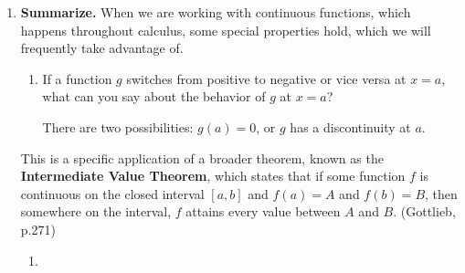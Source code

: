\documentclass[main]{subfiles}
\providecommand{\note}[1]{}
\begin{document}
\begin{enumerate}[resume]
\begin{enumerate}
    \begin{solution}
      If we get rid of the requirement that the function is continuous, then it's possible:
      \begin{center}
      \end{center}
    \end{solution}

  \end{enumerate}

\item  \textbf{Summarize.} When we are working with continuous functions, which happens throughout calculus, some special properties hold, which we will frequently take advantage of. 

  \begin{enumerate}
  \item
    \note{There are two possibilities: $g(a) = 0$ or $g$ has a discontinuity at $a$.}

    \begin{problem}[0.5in]
      If a function $g$ switches from positive to negative or vice versa at $x = a$, what can you say about the behavior of $g$ at $x = a$?
    \end{problem}

    \begin{solution}
      There are two possibilities: $g(a) = 0$, or $g$ has a discontinuity at $a$.
    \end{solution}
\end{enumerate}
\begin{framed}
    This is a specific application of a broader theorem, known as the \textbf{Intermediate Value Theorem}, which states that if some function $f$ is continuous on the closed interval $[a, b]$ and $f(a) = A$ and $f(b)=B$, then somewhere on the interval, $f$ attains every value between $A$ and $B$. (Gottlieb, p.271)
\end{framed}
\begin{enumerate}[resume]
  \item

    \note{So, when we want to make a sign chart for a function, we really need to look for places where the function is 0 or where it has a discontinuity (which, for functions with a non-piecewise algebraic formula, just means it's undefined).

}
\end{enumerate}
\end{enumerate}
\end{document}
